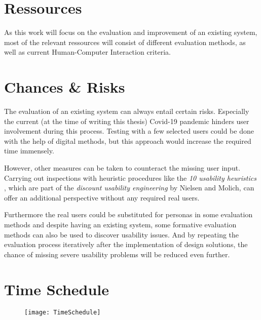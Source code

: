\section{Ressources}\label{ressourcen}

As this work will focus on the evaluation and improvement of an existing system, most of the relevant ressources will consist of different evaluation methods, as well as current Human-Computer Interaction criteria. 


\section{Chances \& Risks}

The evaluation of an existing system can always entail certain risks. Especially the current (at the time of writing this thesis) Covid-19 pandemic hinders user involvement during this process. Testing with a few selected users could be done with the help of digital methods, but this approach would increase the required time immensely.

However, other measures can be taken to counteract the missing user input. Carrying out inspections with heuristic procedures like the \emph{10 usability heuristics} \cite{usability_heuristics}, which are part of the \emph{discount usability engineering} \cite{discount_usability_engineering} by Nielsen and Molich, can offer an additional perspective without any required real users.


Furthermore the real users could be substituted for personas in some evaluation methods and despite having an existing system, some formative evaluation methods can also be used to discover usability issues.
And by repeating the evaluation process iteratively after the implementation of design solutions, the chance of missing severe usability problems will be reduced even further.

\newpage

\section{Time Schedule}
\begin{figure}[h]
\centering
\texttt{[image: TimeSchedule]}
\label{fig:timeSchedule}
\end{figure}
